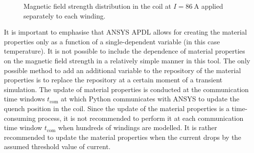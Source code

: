 \begin{figure}[H]
    \centering
    \caption{Magnetic field strength distribution in the coil at $I=86~\text{A}$ applied separately to each winding.}
    \label{fig:skew_quad_magnetic_interpolation_coil_ansys}
\end{figure}

It is important to emphasise that ANSYS APDL allows for creating the material properties only as a function of a single-dependent variable (in this case temperature). It is not possible to include the dependence of material properties on the magnetic field strength in a relatively simple manner in this tool. The only possible method to add an additional variable to the repository of the material properties is to replace the repository at a certain moment of a transient simulation. The update of material properties is conducted at the communication time windows $t_\text{com}$ at which Python communicates with ANSYS to update the quench position in the coil. Since the update of the material properties is a time-consuming process, it is not recommended to perform it at each communication time window $t_\text{com}$ when hundreds of windings are modelled. It is rather recommended to update the material properties when the current drops by the assumed threshold value of current.